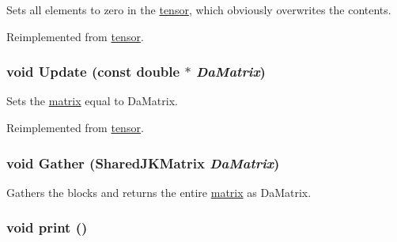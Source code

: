 Sets all elements to zero in the \hyperlink{classJKBuilder_1_1tensor}{tensor}, which obviously overwrites the contents. 

Reimplemented from \hyperlink{classJKBuilder_1_1tensor_a98b1050f09da390896f964fb7a892391}{tensor}.\hypertarget{classJKBuilder_1_1DistributedMatrix_a6a378face23ba83b2431cb08e8519066}{
\subsubsection[{Update}]{\setlength{\rightskip}{0pt plus 5cm}void Update (const double $\ast$ {\em DaMatrix})}}
\label{classJKBuilder_1_1DistributedMatrix_a6a378face23ba83b2431cb08e8519066}


Sets the \hyperlink{classJKBuilder_1_1matrix}{matrix} equal to DaMatrix. 

Reimplemented from \hyperlink{classJKBuilder_1_1tensor_a10ffea2bf428adfa3e8319646c44a3c6}{tensor}.\hypertarget{classJKBuilder_1_1DistributedMatrix_a825e549c725b991ad81d4ea25f630d9e}{
\subsubsection[{Gather}]{\setlength{\rightskip}{0pt plus 5cm}void Gather ({\bf SharedJKMatrix} {\em DaMatrix})}}
\label{classJKBuilder_1_1DistributedMatrix_a825e549c725b991ad81d4ea25f630d9e}


Gathers the blocks and returns the entire \hyperlink{classJKBuilder_1_1matrix}{matrix} as DaMatrix. \hypertarget{classJKBuilder_1_1DistributedMatrix_a388f572c62279f839ee138a9afbdeeb5}{
\subsubsection[{print}]{\setlength{\rightskip}{0pt plus 5cm}void print ()}}
\label{classJKBuilder_1_1DistributedMatrix_a388f572c62279f839ee138a9afbdeeb5}


